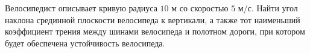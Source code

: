 Велосипедист описывает кривую радиуса $10$ м со скоростью $5$ м/с.
Найти угол наклона срединной плоскости велосипеда к вертикали,
а также тот наименьший коэффициент трения между шинами велосипеда
и полотном дороги, при котором будет обеспечена устойчивость велосипеда.
